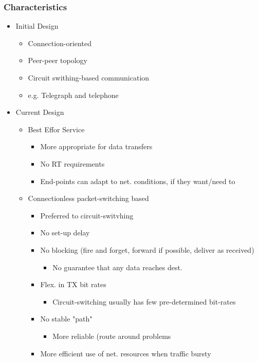 \subsubsection{Characteristics}
\begin{itemize}
	\item Initial Design
	\begin{itemize}
		\item Connection-oriented
		\item Peer-peer topology
		\item Circuit swithing-based communication
		\item e.g. Telegraph and telephone
	\end{itemize}
	\item Current Design
	\begin{itemize}
		\item Best Effor Service
		\begin{itemize}
			\item More appropriate for data transfers
			\item No RT requirements
			\item End-points can adapt to net. conditions, if they
				want/need to
		\end{itemize}
		\item Connectionless packet-switching based
		\begin{itemize}
			\item Preferred to circuit-switvhing
			\item No set-up delay
			\item No blocking (fire and forget, forward if possible,
				deliver as received)
			\begin{itemize}
				\item No guarantee that any data reaches dest.
			\end{itemize}
			\item Flex. in TX bit rates
			\begin{itemize}
				\item Circuit-switching usually has few
					pre-determined bit-rates
			\end{itemize}
			\item No stable "path"
			\begin{itemize}
				\item More reliable (route around problems
			\end{itemize}
			\item More efficient use of net. resources when traffic
				bursty
		\end{itemize}
	\end{itemize}
\end{itemize}
